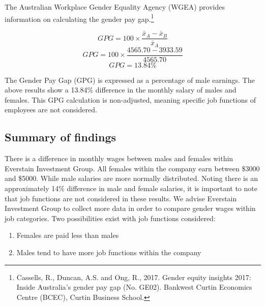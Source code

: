 \documentclass[11pt]{article}
\begin{document}
The Australian Workplace Gender Equality Agency (WGEA) provides information on calculating the gender pay gap.\footnote{Cassells, R., Duncan, A.S. and Ong, R., 2017. Gender equity insights 2017: Inside Australia’s gender pay gap (No. GE02). Bankwest Curtin Economics Centre (BCEC), Curtin Business School.}

\begin{mdframed}[
frametitle={Gender Pay Gap},
frametitlerule=true,
frametitlebackgroundcolor=mygray
]
\begin{center}
\begin{equation}
GPG = 100 \times \dfrac{\bar{x}_A-\bar{x}_B}{\bar{x}_A}	
\end{equation}
\hspace{1cm}
\begin{equation}
	GPG = 100 \times \dfrac{4565.70-3933.59}{4565.70}	
\end{equation}
\hspace{1cm}
\begin{equation}
	GPG = 13.84\%
\end{equation}
\end{center}
\hspace{1cm}
\end{mdframed}

The Gender Pay Gap (GPG) is expressed as a percentage of male earnings. The above results show a 13.84\% difference in the monthly salary of males and females. This GPG calculation is non-adjusted, meaning specific job functions of employees are not considered.

\subsection{Summary of findings}
There is a difference in monthly wages between males and females within Everstain Investment Group. All females within the company earn between \$3000 and \$5000. While male salaries are more normally distributed. Noting there is an approximately 14\% difference in male and female salaries, it is important to note that job functions are not considered in these results. We advise Everstain Investment Group to collect more data in order to compare gender wages within job categories. Two possibilities exist with job functions considered:
\begin{enumerate}
	\item Females are paid less than males
	\item Males tend to have more job functions within the company
\end{enumerate}
\end{document}
